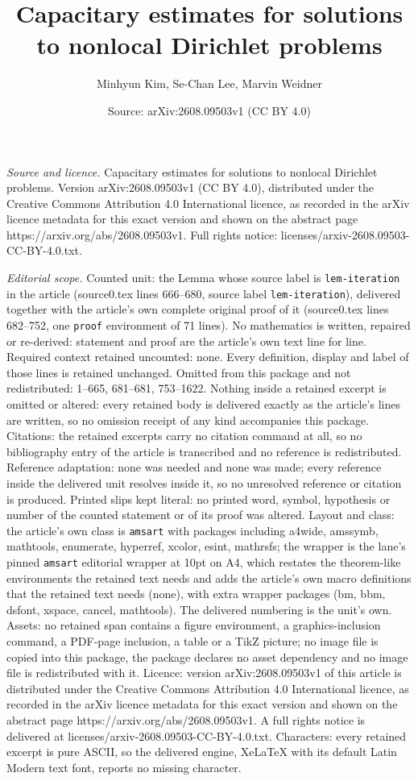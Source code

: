 \documentclass[10pt,a4paper]{amsart}
\title[Capacitary estimates for solutions to nonlocal Dirichlet pro]{Capacitary estimates for solutions to nonlocal Dirichlet problems}
\author{Minhyun Kim, Se-Chan Lee, Marvin Weidner}
\date{Source: arXiv:2608.09503v1 (CC BY 4.0)}
\begin{document}
\maketitle

\noindent\emph{Source and licence.} Capacitary estimates for solutions to nonlocal Dirichlet problems. Version arXiv:2608.09503v1 (CC BY 4.0), distributed under the Creative Commons Attribution 4.0 International licence, as recorded in the arXiv licence metadata for this exact version and shown on the abstract page https://arxiv.org/abs/2608.09503v1. Full rights notice: licenses/arxiv-2608.09503-CC-BY-4.0.txt.\par\smallskip

\noindent\textit{Editorial scope.} Counted unit: the Lemma whose source label is \texttt{lem-iteration} in the article (source0.tex lines 666--680, source label \texttt{lem-iteration}), delivered together with the article's own complete original proof of it (source0.tex lines 682--752, one \texttt{proof} environment of 71 lines). No mathematics is written, repaired or re-derived: statement and proof are the article's own text line for line. Required context retained uncounted: none. Every definition, display and label of those lines is retained unchanged. Omitted from this package and not redistributed: 1--665, 681--681, 753--1622. Nothing inside a retained excerpt is omitted or altered: every retained body is delivered exactly as the article's lines are written, so no omission receipt of any kind accompanies this package. Citations: the retained excerpts carry no citation command at all, so no bibliography entry of the article is transcribed and no reference is redistributed. Reference adaptation: none was needed and none was made; every reference inside the delivered unit resolves inside it, so no unresolved reference or citation is produced. Printed slips kept literal: no printed word, symbol, hypothesis or number of the counted statement or of its proof was altered. Layout and class: the article's own class is \texttt{amsart} with packages including a4wide, amssymb, mathtools, enumerate, hyperref, xcolor, esint, mathrsfs; the wrapper is the lane's pinned \texttt{amsart} editorial wrapper at 10pt on A4, which restates the theorem-like environments the retained text needs and adds the article's own macro definitions that the retained text needs (none), with extra wrapper packages (bm, bbm, dsfont, xspace, cancel, mathtools). The delivered numbering is the unit's own. Assets: no retained span contains a figure environment, a graphics-inclusion command, a PDF-page inclusion, a table or a TikZ picture; no image file is copied into this package, the package declares no asset dependency and no image file is redistributed with it. Licence: version arXiv:2608.09503v1 of this article is distributed under the Creative Commons Attribution 4.0 International licence, as recorded in the arXiv licence metadata for this exact version and shown on the abstract page https://arxiv.org/abs/2608.09503v1. A full rights notice is delivered at licenses/arxiv-2608.09503-CC-BY-4.0.txt. Characters: every retained excerpt is pure ASCII, so the delivered engine, XeLaTeX with its default Latin Modern text font, reports no missing character.
\end{document}
